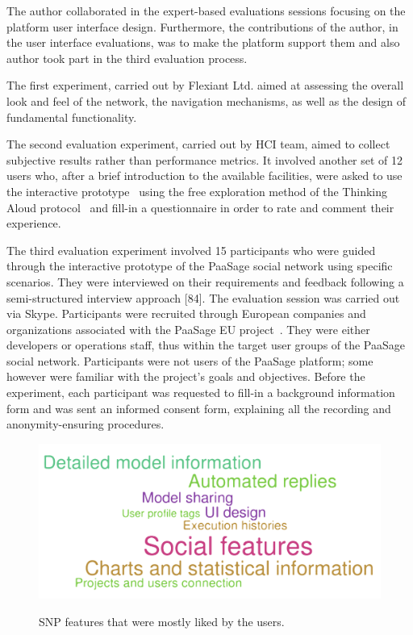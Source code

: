 The author collaborated in the expert-based evaluations sessions focusing on the platform user interface design. Furthermore, the contributions of the author, in the user interface evaluations, was to make the platform support them and also author took part in the third evaluation process.  

The first experiment, carried out by Flexiant Ltd. aimed at assessing the overall look and feel of the network, the navigation mechanisms, as well as the design of fundamental functionality.

The second evaluation experiment, carried out by HCI team, aimed to collect subjective results rather than performance metrics. It involved another set of 12 users who, after a brief introduction to the available facilities, were asked to use the interactive prototype~\cite{Virzi1996} using the free exploration method of the Thinking Aloud protocol~\cite{jordan1998introduction} and fill-in a questionnaire in order to rate and comment their experience. 

The third evaluation experiment involved 15 participants who were guided through the interactive prototype of the PaaSage social network using specific scenarios. They were interviewed on their requirements and feedback following a semi-structured interview approach [84]. The evaluation session was carried out via Skype. Participants were recruited through European companies and organizations associated with the PaaSage EU project~\cite{paasage}. They were either developers or operations staff, thus within the target user groups of the PaaSage social network. Participants were not users of the PaaSage platform; some however were familiar with the project’s goals and objectives. Before the experiment, each participant was requested to fill-in a background information form and was sent an informed consent form, explaining all the recording and anonymity-ensuring procedures. 

\begin{figure}[h]
	\caption{SNP features that were mostly liked by the users.}
	\includegraphics[width=1\textwidth,natwidth=200,natheight=150]{./fig/most-liked.pdf}
	\centering
	\label{fig:most-liked}
\end{figure}

